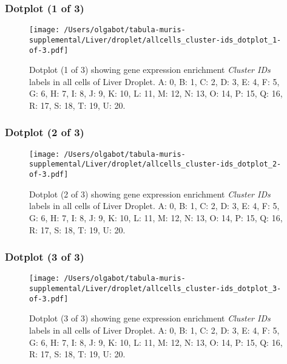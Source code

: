 \clearpage

\subsubsection{Dotplot (1 of 3)}
\begin{figure}[h]
\centering
\texttt{[image: /Users/olgabot/tabula-muris-supplemental/Liver/droplet/allcells\_cluster-ids\_dotplot\_1-of-3.pdf]}

\caption{ Dotplot (1 of 3)  showing gene expression enrichment \emph{Cluster IDs} labels in all cells of Liver Droplet. A: 0, B: 1, C: 2, D: 3, E: 4, F: 5, G: 6, H: 7, I: 8, J: 9, K: 10, L: 11, M: 12, N: 13, O: 14, P: 15, Q: 16, R: 17, S: 18, T: 19, U: 20.}
\end{figure}


\clearpage

\subsubsection{Dotplot (2 of 3)}
\begin{figure}[h]
\centering
\texttt{[image: /Users/olgabot/tabula-muris-supplemental/Liver/droplet/allcells\_cluster-ids\_dotplot\_2-of-3.pdf]}

\caption{ Dotplot (2 of 3)  showing gene expression enrichment \emph{Cluster IDs} labels in all cells of Liver Droplet. A: 0, B: 1, C: 2, D: 3, E: 4, F: 5, G: 6, H: 7, I: 8, J: 9, K: 10, L: 11, M: 12, N: 13, O: 14, P: 15, Q: 16, R: 17, S: 18, T: 19, U: 20.}
\end{figure}


\clearpage

\subsubsection{Dotplot (3 of 3)}
\begin{figure}[h]
\centering
\texttt{[image: /Users/olgabot/tabula-muris-supplemental/Liver/droplet/allcells\_cluster-ids\_dotplot\_3-of-3.pdf]}

\caption{ Dotplot (3 of 3)  showing gene expression enrichment \emph{Cluster IDs} labels in all cells of Liver Droplet. A: 0, B: 1, C: 2, D: 3, E: 4, F: 5, G: 6, H: 7, I: 8, J: 9, K: 10, L: 11, M: 12, N: 13, O: 14, P: 15, Q: 16, R: 17, S: 18, T: 19, U: 20.}
\end{figure}


\clearpage

